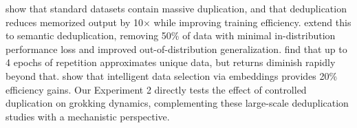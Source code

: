 \citet{lee2022deduplicating} show that standard datasets contain massive duplication, and that deduplication reduces memorized output by 10$\times$ while improving training efficiency. \citet{abbas2023semdedup} extend this to semantic deduplication, removing 50\% of data with minimal in-distribution performance loss and improved out-of-distribution generalization. \citet{muennighoff2023scaling} find that up to 4 epochs of repetition approximates unique data, but returns diminish rapidly beyond that. \citet{tirumala2023d4} show that intelligent data selection via embeddings provides 20\% efficiency gains. Our Experiment 2 directly tests the effect of controlled duplication on grokking dynamics, complementing these large-scale deduplication studies with a mechanistic perspective.
